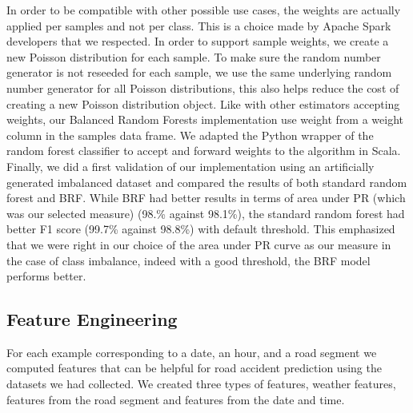 \documentclass[conference]{IEEEtran}
\begin{document}
In order to be compatible with other possible use cases, the weights are actually applied per samples and not per class.
This is a choice made by Apache Spark developers that we respected.
In order to support sample weights, we create a new Poisson distribution for each sample.
To make sure the random number generator is not reseeded for each sample, we use the same underlying random number generator for all Poisson distributions, this also helps reduce the cost of creating a new Poisson distribution object.
Like with other estimators accepting weights, our Balanced Random Forests implementation use weight from a weight column in the samples data frame.
We adapted the Python wrapper of the random forest classifier to accept and forward weights to the algorithm in Scala.
Finally, we did a first validation of our implementation using an artificially generated imbalanced dataset and compared the results of both standard random forest and BRF.
While BRF had better results in terms of area under PR (which was our selected measure) (98.\% against 98.1\%), the standard random forest had better F1 score (99.7\% against 98.8\%) with default threshold.
This emphasized that we were right in our choice of the area under PR curve as our measure in the case of class imbalance, indeed with a good threshold, the BRF model performs better.

\subsection{Feature Engineering}
For each example corresponding to a date, an hour, and a road segment we computed features that can be helpful for road accident prediction using the datasets we had collected. We created three types of features, weather features, features from the road segment and features from the date and time.
\end{document}

